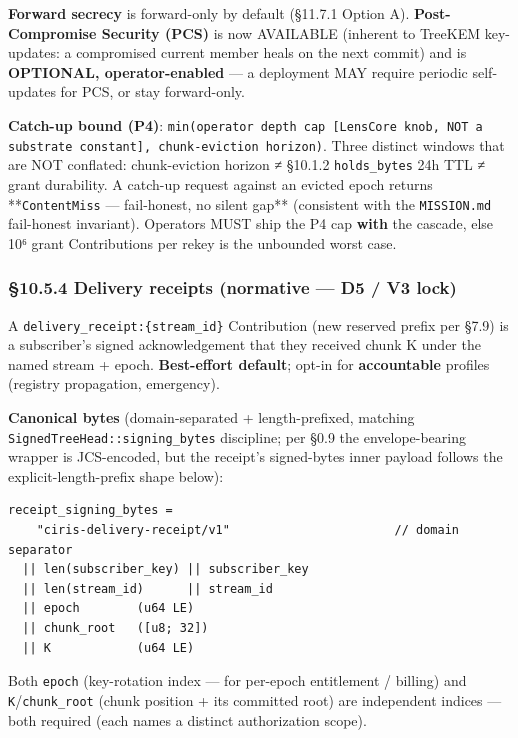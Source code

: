 \documentclass[11pt]{article}
\begin{document}
\textbf{Forward secrecy} is forward-only by default (§11.7.1 Option A). \textbf{Post-Compromise Security (PCS)} is now AVAILABLE (inherent to TreeKEM key-updates: a compromised current member heals on the next commit) and is \textbf{OPTIONAL, operator-enabled} — a deployment MAY require periodic self-updates for PCS, or stay forward-only.


\textbf{Catch-up bound (P4)}: \texttt{min(operator depth cap [LensCore knob, NOT a substrate constant], chunk-eviction horizon)}. Three distinct windows that are NOT conflated: chunk-eviction horizon ≠ §10.1.2 \texttt{holds\_bytes} 24h TTL ≠ grant durability. A catch-up request against an evicted epoch returns **\texttt{ContentMiss} — fail-honest, no silent gap** (consistent with the \texttt{MISSION.md} fail-honest invariant). Operators MUST ship the P4 cap \textbf{with} the cascade, else 10⁶ grant Contributions per rekey is the unbounded worst case.


\subsubsection*{§10.5.4 Delivery receipts (normative — D5 / V3 lock)}


A \texttt{delivery\_receipt:\{stream\_id\}} Contribution (new reserved prefix per §7.9) is a subscriber's signed acknowledgement that they received chunk K under the named stream + epoch. \textbf{Best-effort default}; opt-in for \textbf{accountable} profiles (registry propagation, emergency).


\textbf{Canonical bytes} (domain-separated + length-prefixed, matching \texttt{SignedTreeHead::signing\_bytes} discipline; per §0.9 the envelope-bearing wrapper is JCS-encoded, but the receipt's signed-bytes inner payload follows the explicit-length-prefix shape below):


\begin{lstlisting}
receipt_signing_bytes =
    "ciris-delivery-receipt/v1"                       // domain separator
  || len(subscriber_key) || subscriber_key
  || len(stream_id)      || stream_id
  || epoch        (u64 LE)
  || chunk_root   ([u8; 32])
  || K            (u64 LE)
\end{lstlisting}

Both \texttt{epoch} (key-rotation index — for per-epoch entitlement / billing) and \texttt{K}/\texttt{chunk\_root} (chunk position + its committed root) are independent indices — both required (each names a distinct authorization scope).
\end{document}
